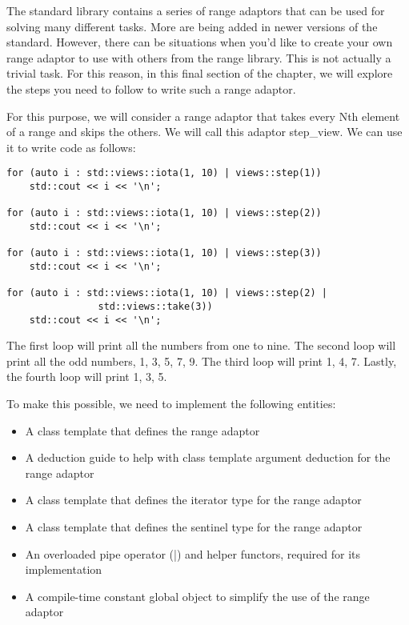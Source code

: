 The standard library contains a series of range adaptors that can be used for solving many different tasks. More are being added in newer versions of the standard. However, there can be situations when you’d like to create your own range adaptor to use with others from the range library. This is not actually a trivial task. For this reason, in this final section of the chapter, we will explore the steps you need to follow to write such a range adaptor.

For this purpose, we will consider a range adaptor that takes every Nth element of a range and skips the others. We will call this adaptor step\_view. We can use it to write code as follows:

\begin{lstlisting}[style=styleCXX]
for (auto i : std::views::iota(1, 10) | views::step(1))
	std::cout << i << '\n';

for (auto i : std::views::iota(1, 10) | views::step(2))
	std::cout << i << '\n';

for (auto i : std::views::iota(1, 10) | views::step(3))
	std::cout << i << '\n';

for (auto i : std::views::iota(1, 10) | views::step(2) | 	
				std::views::take(3))
	std::cout << i << '\n';
\end{lstlisting}

The first loop will print all the numbers from one to nine. The second loop will print all the odd numbers, 1, 3, 5, 7, 9. The third loop will print 1, 4, 7. Lastly, the fourth loop will print 1, 3, 5.

To make this possible, we need to implement the following entities:

\begin{itemize}
\item
A class template that defines the range adaptor

\item
A deduction guide to help with class template argument deduction for the range adaptor

\item
A class template that defines the iterator type for the range adaptor

\item
A class template that defines the sentinel type for the range adaptor

\item
An overloaded pipe operator (|) and helper functors, required for its implementation

\item
A compile-time constant global object to simplify the use of the range adaptor
\end{itemize}

